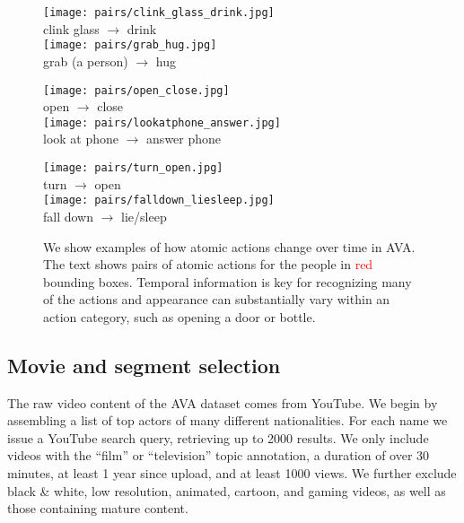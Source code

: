 \documentclass[10pt,twocolumn,letterpaper]{article}
\begin{document}
\begin{figure*}[tb!]
    \centering
    \small
\begin{minipage}{0.32\linewidth}\centering\texttt{[image: pairs/clink\_glass\_drink.jpg]} \\[-0.12cm]
clink glass $\rightarrow$ drink \\[0.11cm]
\texttt{[image: pairs/grab\_hug.jpg]} \\[-0.12cm]
grab (a person) $\rightarrow$ hug \\[0.11cm]\end{minipage}\hfill\begin{minipage}{0.32\linewidth}\centering
\texttt{[image: pairs/open\_close.jpg]} \\[-0.12cm]
open $\rightarrow$ close \\[0.11cm]
\texttt{[image: pairs/lookatphone\_answer.jpg]} \\[-0.12cm]
look at phone $\rightarrow$ answer phone \\[0.11cm]\end{minipage}\hfill\begin{minipage}{0.32\linewidth}\centering
\texttt{[image: pairs/turn\_open.jpg]} \\[-0.12cm]
turn $\rightarrow$ open \\[0.11cm]
\texttt{[image: pairs/falldown\_liesleep.jpg]} \\[-0.12cm]
fall down $\rightarrow$ lie/sleep \\[0.11cm]
\end{minipage}
\caption{We show examples of how atomic actions change over time in AVA. The text shows pairs of atomic actions for the people in \textcolor{red}{red} bounding boxes. Temporal information is key for recognizing many of the actions and appearance can substantially vary within an action category, such as opening a door or bottle.}\label{fig:example_annotations}
\vspace{-1em}
\end{figure*}

\subsection{Movie and segment selection}

The raw video content of the AVA dataset comes from YouTube. We begin by assembling a list of top actors of many different nationalities. For each name we issue a YouTube search query, retrieving up to 2000 results. We only include videos with the ``film'' or ``television'' topic annotation, a duration of over 30 minutes, at least 1 year since upload, and at least 1000 views. We further exclude black \& white, low resolution, animated, cartoon, and gaming videos, as well as those containing mature content.
\end{document}
